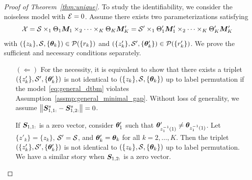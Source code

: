 \documentclass[lettersize,onecolumn,journal]{IEEEtran}
\theoremstyle{definition}
\theoremstyle{definition}
\newcommand{\of}[1]{\left(#1\right)}
\begin{document}
\begin{proof}[Proof of Theorem~\ref{thm:unique}] 

To study the identifiability, we consider the noiseless model with $\mathcal{E} = 0$. Assume there exists two parameterizations satisfying
\begin{equation}\label{eq:another}
    \tX=\tS\times_1\Theta_1 \mM_1 \times_2 \cdots \times_K \Theta_K \mM'_K=\tS'\times_1\Theta'_1 \mM'_1 \times_2 \cdots \times_K \Theta'_K \mM'_K
\end{equation}
with $\of{ \{z_k\}, \tS, \{ \mtheta_k \} } \in \tP(\{r_k\})$ and $\of{ \{z'_k\}, \tS', \{ \mtheta'_k \} } \in \tP(\{r_k'\})$. We prove the sufficient and necessary conditions separately.

\begin{enumerate}
    \item[$(\Leftarrow)$] For the necessity, it is equivalent to show that there exists a triplet $\of{ \{z'_k\}, \tS', \{ \mtheta'_k \} }$ is not identical to $\of{ \{z_k\}, \tS, \{ \mtheta_k \} }$ up to label permutation if the model~\eqref{eq:general_dtbm} violates Assumption~\ref{assmp:general_minimal_gap}. Without loss of generality, we assume $\left\lVert \bm S_{1,1:}^s - \bm S_{1,2:}^s \right\rVert = 0$.

 If $\bm S_{1,1:}$ is a zero vector, consider $\boldsymbol{\theta}_1'$ such that $\boldsymbol{\theta}'_{z_1^{-1}(1)} \neq \boldsymbol{\theta}_{z_1^{-1}(1)}$. Let $\{z'_k\} = \{z_k\}$, $\mathcal{S}' = \mathcal{S}$, and $\boldsymbol{\theta}'_k = \boldsymbol{\theta}_k$ for all $k = 2, \ldots, K$. Then the triplet $\of{ \{z'_k\}, \tS', \{ \mtheta'_k \} }$ is not identical to $\of{ \{z_k\}, \tS, \{ \mtheta_k \} }$ up to label permutation. We have a similar story when $\bm S_{1,2:}$ is a zero vector. 


\end{enumerate}
\end{proof}
\end{document}
